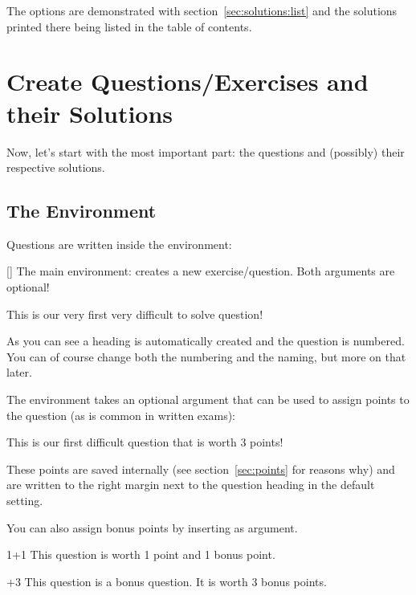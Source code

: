 \documentclass[load-preamble+]{cnltx-doc}
\begin{document}
The  options are demonstrated with section~\ref{sec:solutions:list}
and the solutions printed there being listed in the table of contents.


\section{Create Questions/Exercises and their Solutions}
Now, let's start with the most important part: the questions and (possibly)
their respective solutions.
\subsection{The  Environment}\label{ssec:questions}
Questions are written inside the  environment:
\begin{environments}
  []
    The main environment: creates a new exercise/question.  Both arguments are
    optional!
\end{environments}
\begin{example}
  \begin{question}
    This is our very first very difficult to solve question!
  \end{question}
\end{example}
As you can see a heading is automatically created and the question is
numbered.  You can of course change both the numbering and the naming, but
more on that later.

The  environment takes an optional argument  that
can be used to assign points to the question (as is common in written exams):
\begin{example}
  \begin{question}{3}
    This is our first difficult question that is worth 3 points!
  \end{question}
\end{example}
These points are saved internally (see section~\ref{sec:points} for reasons
why) and are written to the right margin next to the question heading in the
default setting.

You can also assign bonus points by inserting  as argument.
\begin{example}
  \begin{question}{1+1}
    This question is worth 1 point and 1 bonus point.
  \end{question}
  \begin{question}{+3}
    This question is a bonus question. It is worth 3 bonus points.
  \end{question}
\end{example}
\end{document}
